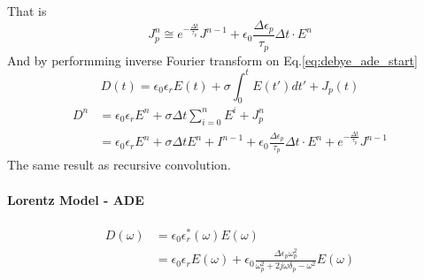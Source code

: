 That is 
\begin{equation}
  J_p^n \cong e^{-\frac{\Delta t}{\tau_p}}J^{n-1} + \epsilon_0 \frac{\Delta\epsilon_p}{\tau_p}\Delta t\cdot E^n
\end{equation}
And by performming inverse Fourier transform on Eq.\ref{eq:debye_ade_start}
\begin{equation}
  D(t) = \epsilon_0\epsilon_rE(t) + \sigma \int_0^t E(t')dt' + J_p(t)
\end{equation}
\begin{equation}
  \begin{split}
    D^n & = \epsilon_0\epsilon_rE^n + \sigma\Delta t\sum_{i=0}^n E^i + J_p^n\\
    & = \epsilon_0\epsilon_rE^n + \sigma\Delta tE^n + I^{n-1} + \epsilon_0\frac{\Delta\epsilon_p}{\tau_p}\Delta t\cdot E^n + e^{-\frac{\Delta t}{\tau_p}}J^{n-1}
  \end{split}
\end{equation}
The same result as recursive convolution.






\paragraph{{\msjh Lorentz Model - ADE}}
\begin{equation}
  \begin{split}
    D(\omega) & = \epsilon_0\epsilon_r^*(\omega)E(\omega)\\
    & = \epsilon_0\epsilon_rE(\omega) + \epsilon_0 \frac{\Delta \epsilon_p \omega_p^2}{\omega_p^2+2j\omega\delta_p-\omega^2}E(\omega)
  \end{split}
\end{equation}

